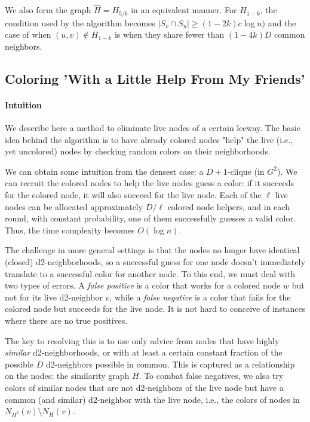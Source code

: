 \documentclass[12pt,a4]{article}
\begin{document}
We also form the graph $\hat{H} = H_{5/6}$ in an equivalent manner.
For $H_{1-k}$, the condition used by the algorithm becomes $|S_v \cap S_u| \ge (1-2k)c \log n)$ and the case of when $(u,v) \not\in H_{1-k}$ is when they share fewer than $(1-4k)D$ common neighbors.

\subsection{Coloring 'With a Little Help From My Friends'}

\paragraph{Intuition}
We describe here a method to eliminate live nodes of a certain leeway.
The basic idea behind the algorithm is to have already colored nodes "help" the live (i.e., yet uncolored) nodes by checking random colors on their neighborhoods.

We can obtain some intuition from the densest case: a $D+1$-clique (in $G^2$).
We can recruit the colored nodes to help the live nodes guess a color: if it succeeds for the colored node, it will also succeed for the live node. Each of the $\ell$ live nodes can be allocated approximately $D/\ell$ colored node helpers, and in each round, with constant probability, one of them successfully guesses a valid color. Thus, the time complexity becomes $O(\log n)$.

The challenge in more general settings is that the nodes no longer have identical (closed) d2-neighborhoods, so a successful guess for one node doesn't immediately translate to a successful color for another node.
To this end, we must deal with two types of errors.
A \emph{false positive} is a color that works for a colored node $w$ but not for its live d2-neighbor $v$, while a \emph{false negative} is a color that fails for the colored node but succeeds for the live node.
It is not hard to conceive of instances where there are no true positives.

The key to resolving this is to use only advice from nodes that have highly \emph{similar} d2-neighborhoods, or with at least a certain constant fraction of the possible $D$ d2-neighbors possible in common. This is captured as a relationship on the nodes: the similarity graph $H$.
To combat false negatives, we also try colors of similar nodes that are not d2-neighbors of the live node but have a common (and similar) d2-neighbor with the live node, i.e., the colors of nodes in $N_{H^2}(v) \setminus N_H(v)$.
\end{document}
